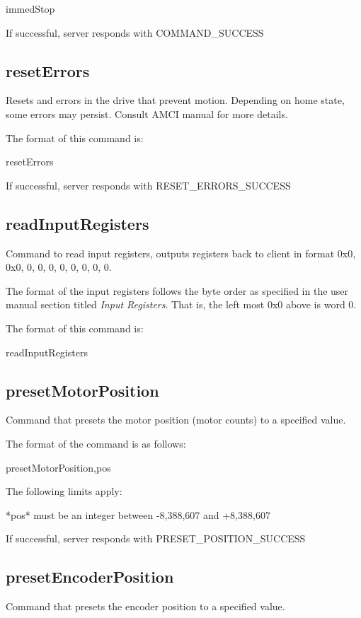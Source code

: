{\ttfamily immed\+Stop}

If successful, server responds with {\ttfamily C\+O\+M\+M\+A\+N\+D\+\_\+\+S\+U\+C\+C\+E\+S\+S}\hypertarget{index_resetErrors}{}\subsection{reset\+Errors}\label{index_resetErrors}
Resets and errors in the drive that prevent motion. Depending on home state, some errors may persist. Consult A\+M\+C\+I manual for more details.

The format of this command is\+:

{\ttfamily reset\+Errors}

If successful, server responds with {\ttfamily R\+E\+S\+E\+T\+\_\+\+E\+R\+R\+O\+R\+S\+\_\+\+S\+U\+C\+C\+E\+S\+S}\hypertarget{index_readInputRegisters}{}\subsection{read\+Input\+Registers}\label{index_readInputRegisters}
Command to read input registers, outputs registers back to client in format 0x0, 0x0, 0, 0, 0, 0, 0, 0, 0, 0.

The format of the input registers follows the byte order as specified in the user manual section titled {\itshape Input Registers}. That is, the left most 0x0 above is word 0.

The format of this command is\+:

{\ttfamily read\+Input\+Registers}\hypertarget{index_presetMotorPosition}{}\subsection{preset\+Motor\+Position}\label{index_presetMotorPosition}
Command that presets the motor position (motor counts) to a specified value.

The format of the command is as follows\+:

{\ttfamily preset\+Motor\+Position,pos}

The following limits apply\+: \begin{DoxyVerb}*pos* must be an integer between -8,388,607 and +8,388,607
\end{DoxyVerb}


If successful, server responds with {\ttfamily P\+R\+E\+S\+E\+T\+\_\+\+P\+O\+S\+I\+T\+I\+O\+N\+\_\+\+S\+U\+C\+C\+E\+S\+S}\hypertarget{index_presetEncoderPosition}{}\subsection{preset\+Encoder\+Position}\label{index_presetEncoderPosition}
Command that presets the encoder position to a specified value.

